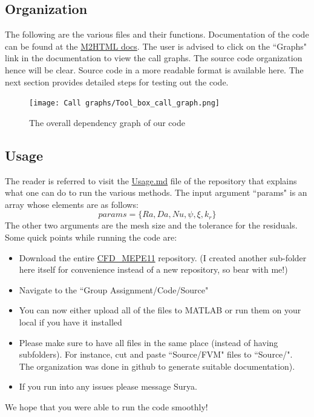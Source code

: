 \documentclass[12pt]{article}
\begin{document}
\subsection{Organization}
The following are the various files and their functions. Documentation of the code can be found at the \href{https://rsuryanarayan.github.io/CFD_Documentation/}{M2HTML docs}. The user is advised to click on the ``Graphs" link in the documentation to view the call graphs. The source code organization hence will be clear. Source code in a more readable format is available here. The next section provides detailed steps for testing out the code.
\begin{figure}[H]
    \centering
    \texttt{[image: Call graphs/Tool\_box\_call\_graph.png]}
    \caption{The overall dependency graph of our code}
    \label{fig:38}
\end{figure}
\subsection{Usage}
The reader is referred to visit the \href{https://bit.ly/3aa4or7}{Usage.md} file of the repository that explains what one can do to run the various methods. The input argument ``params" is an array whose elements are as follows: 
\[
params = \{Ra, Da, Nu, \psi, \xi, k_r\} \tag{60} \label{60}
\]
The other two arguments are the mesh size and the tolerance for the residuals. Some quick points while running the code are:
\begin{itemize}
    \item Download the entire  \href{https://github.com/RSuryaNarayan/CFD_MEPE11}{CFD\_MEPE11} repository. (I created another sub-folder here itself for convenience instead of a new repository, so bear with me!)
    \item Navigate to the ``Group Assignment/Code/Source"
    \item You can now either upload all of the files to MATLAB or run them on your local if you have it installed
    \item Please make sure to have all files in the same place (instead of having subfolders). For instance, cut and paste ``Source/FVM" files to ``Source/". The organization was done in github to generate suitable documentation).
    \item If you run into any issues please message Surya.
\end{itemize}
We hope that you were able to run the code smoothly! 
\clearpage
\end{document}

